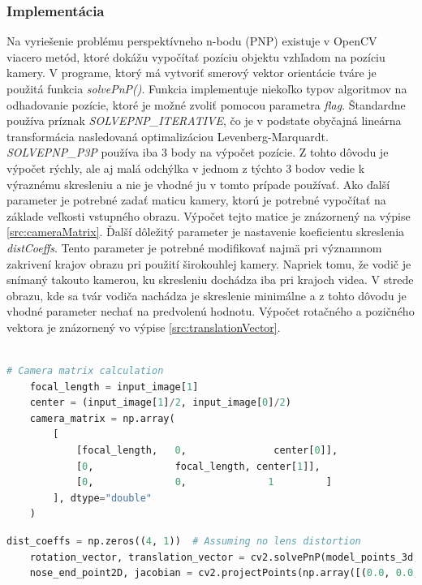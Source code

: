 \documentclass[slovak,master,dept460,male,cpp,cpdeclaration]{diploma}
\begin{document}
\subsubsection*{Implementácia}
Na vyriešenie problému perspektívneho n-bodu (PNP) existuje v OpenCV viacero metód, ktoré dokážu vypočítať  pozíciu objektu vzhľadom na pozíciu kamery. V programe, ktorý má vytvoriť smerový vektor orientácie tváre  je použitá funkcia \textit{solvePnP()}. Funkcia implementuje niekoľko typov algoritmov na odhadovanie pozície, ktoré je možné zvoliť pomocou parametra \textit{flag}. Štandardne používa príznak \textit{SOLVEPNP\_ITERATIVE}, čo je v podstate obyčajná lineárna transformácia nasledovaná optimalizáciou Levenberg-Marquardt. \textit{SOLVEPNP\_P3P} používa iba 3 body na výpočet pozície. Z tohto dôvodu je výpočet rýchly, ale  aj malá odchýlka  v jednom z týchto 3 bodov vedie k výraznému skresleniu a nie je vhodné ju v tomto prípade používať.  Ako ďalší parameter je potrebné  zadať  maticu kamery, ktorú je potrebné vypočítať na základe veľkosti vstupného obrazu. Výpočet tejto matice je znázornený na výpise \ref{src:cameraMatrix}. Ďalší dôležitý parameter je nastavenie koeficientu skreslenia \textit{distCoeffs}. Tento parameter je potrebné modifikovať najmä pri významnom zakrivení krajov obrazu pri použití širokouhlej kamery. Napriek tomu, že vodič je snímaný  takouto kamerou, ku skresleniu dochádza iba pri krajoch videa. V strede obrazu, kde sa tvár vodiča nachádza je skreslenie minimálne a z tohto dôvodu je vhodné parameter nechať na predvolenú hodnotu. Výpočet rotačného a pozičného vektora je znázornený vo výpise \ref{src:translationVector}.
\\\\
\begin{lstlisting}[language=Python,label=src:cameraMatrix,caption={Výpočet  matice kamery}]
    # Camera matrix calculation
    focal_length = input_image[1]
    center = (input_image[1]/2, input_image[0]/2)
    camera_matrix = np.array(
        [
            [focal_length,   0,               center[0]],
            [0,              focal_length, center[1]],
            [0,              0,              1         ]
        ], dtype="double"
    )
\end{lstlisting}

\newpage
\begin{lstlisting}[language=Python,label=src:translationVector,caption={rotačného a pozičného vektora}]
    dist_coeffs = np.zeros((4, 1))  # Assuming no lens distortion
    rotation_vector, translation_vector = cv2.solvePnP(model_points_3d, image_points, camera_matrix, dist_coeffs, flags=cv2.SOLVEPNP_ITERATIVE)
    nose_end_point2D, jacobian = cv2.projectPoints(np.array([(0.0, 0.0, 1000.0)]), rotation_vector, translation_vector, camera_matrix, dist_coeffs)
\end{lstlisting}
\end{document}
